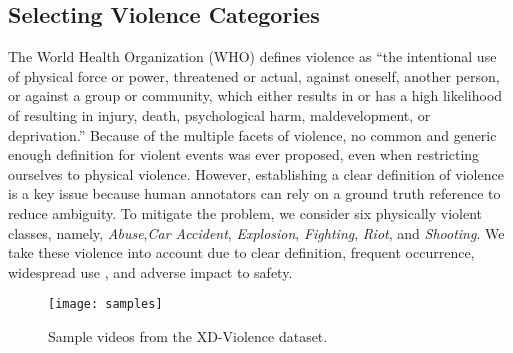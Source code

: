 \documentclass[runningheads]{llncs}
\begin{document}
\subsection{Selecting Violence Categories}
The World Health Organization (WHO) defines violence as ``the intentional use of physical force or power, threatened or actual, against oneself, another person, or against a group or community, which either results in or has a high likelihood of resulting in injury, death, psychological harm, maldevelopment, or deprivation.'' Because of the multiple facets of violence, no common and generic enough definition for violent events was ever proposed, even when restricting ourselves to physical violence. However, establishing a clear definition of violence is a key issue because human annotators can rely on a ground truth reference to reduce ambiguity. 
To mitigate the problem, we consider six physically violent classes, namely, \textit{Abuse},\textit{Car Accident}, \textit{Explosion}, \textit{Fighting}, \textit{Riot}, and \textit{Shooting}. We take these violence into account due to clear definition, frequent occurrence, widespread use \cite{demarty2015vsd,sultani2018real}, and adverse impact to safety.
\begin{figure}[t]
\centering
\texttt{[image: samples]}
\caption{Sample videos from the XD-Violence dataset.}
\label{fig:samples}
\end{figure}
\end{document}
